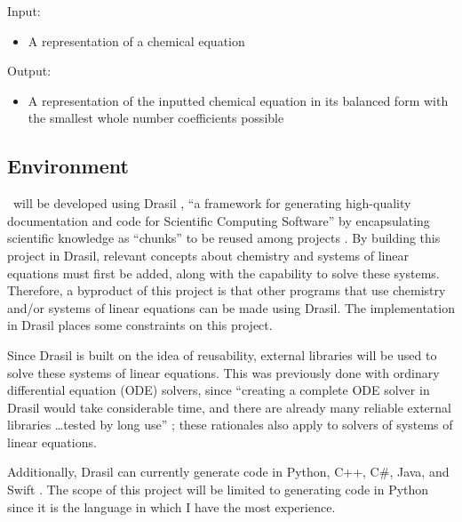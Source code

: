 \documentclass{article}
\begin{document}
\null\newline
\null\newline
\noindent Input:

\begin{itemize}
	\item A representation of a chemical equation
\end{itemize}

\noindent Output:

\begin{itemize}
	\item A representation of the inputted chemical equation in its balanced
	      form with the smallest whole number coefficients possible
\end{itemize}

\subsection{Environment} \label{env}

\null\newline
\null\newline
\noindent\progname~will be developed using Drasil
\cite{carette_drasil_2021}, ``a framework for generating
high-quality documentation and code for Scientific Computing Software''
\cite[p. iii]{maclachlan_design_2020} by encapsulating scientific knowledge as
``chunks'' to be reused among projects \cite{maclachlan_design_2020}. By
building this project in Drasil, relevant concepts about chemistry and systems
of linear equations must first be added, along with the capability to solve
these systems. Therefore, a byproduct of this project is that other programs
that use chemistry and/or systems of linear equations can be made using
Drasil. The implementation in Drasil places some constraints on this project.

Since Drasil is built on the idea of reusability, external libraries will be
used to solve these systems of linear equations. This was previously done with
ordinary differential equation (ODE) solvers, since ``creating a complete ODE
solver in Drasil would take considerable time, and there are already many
reliable external libraries \dots tested by long use''
\cite[p. 24]{chen_solving_2022}; these rationales also apply to solvers of
systems of linear equations.

Additionally, Drasil can currently generate code in Python, C++, C\#, Java, and
Swift \cite{chen_solving_2022}. The scope of this project will be limited to
generating code in Python since it is the language in which I
have the most experience.
\end{document}
